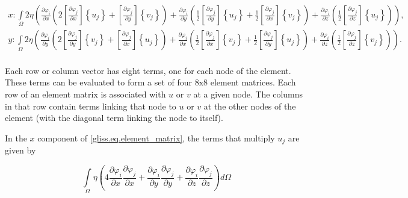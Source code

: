 \begin{equation}
  \label{gliss.eq.element_matrix}
  \begin{split}
    x: \int\limits_{\Omega }{2\eta \left( \frac{\partial {{\varphi }_{i}}}{\partial x}\left( 2\left[ \frac{\partial {{\varphi }_{j}}}{\partial x} \right]\left\{ {{u}_{j}} \right\}+\left[ \frac{\partial {{\varphi }_{j}}}{\partial y} \right]\left\{ {{v}_{j}} \right\} \right)+\frac{\partial {{\varphi }_{i}}}{\partial y}\left( \frac{1}{2}\left[ \frac{\partial {{\varphi }_{j}}}{\partial y} \right]\left\{ {{u}_{j}} \right\}+\frac{1}{2}\left[ \frac{\partial {{\varphi }_{j}}}{\partial x} \right]\left\{ {{v}_{j}} \right\} \right)+\frac{\partial {{\varphi }_{i}}}{\partial z}\left( \frac{1}{2}\left[ \frac{\partial {{\varphi }_{j}}}{\partial z} \right]\left\{ {{u}_{j}} \right\} \right) \right)},  \\
    y: \int\limits_{\Omega }{2\eta \left( \frac{\partial {{\varphi }_{i}}}{\partial y}\left( 2\left[ \frac{\partial {{\varphi }_{j}}}{\partial y} \right]\left\{ {{v}_{j}} \right\}+\left[ \frac{\partial {{\varphi }_{j}}}{\partial x} \right]\left\{ {{u}_{j}} \right\} \right)+\frac{\partial {{\varphi }_{i}}}{\partial x}\left( \frac{1}{2}\left[ \frac{\partial {{\varphi }_{j}}}{\partial x} \right]\left\{ {{v}_{j}} \right\}+\frac{1}{2}\left[ \frac{\partial {{\varphi }_{j}}}{\partial y} \right]\left\{ {{u}_{j}} \right\} \right)+\frac{\partial {{\varphi }_{i}}}{\partial z}\left( \frac{1}{2}\left[ \frac{\partial {{\varphi }_{j}}}{\partial z} \right]\left\{ {{v}_{j}} \right\} \right) \right)}.  \\
  \end{split}
\end{equation}

\noindent
Each row or column vector has eight terms, one for each node of the element.
These terms can be evaluated to form a set of four $8\text{x}8$ element matrices.
Each row of an element matrix is associated with $u$ or $v$ at a given node.  The columns in that row contain terms
linking that node to $u$ or $v$ at the other nodes of the element (with the diagonal term linking the node to itself).  

In the $x$ component of \eqref{gliss.eq.element_matrix}, 
the terms that multiply $u_j$ are given by
 
\begin{equation}
  \label{gliss.eq.matrix_Kuu}
  \int\limits_{\Omega }{\eta \left( 4\frac{\partial {{\varphi }_{i}}}{\partial x}\frac{\partial {{\varphi }_{j}}}{\partial x} +
    \frac{\partial {{\varphi }_{i}}}{\partial y}\frac{\partial {{\varphi}_{j}}}{\partial y} + 
    \frac{\partial {{\varphi }_{i}}}{\partial z}\frac{\partial {{\varphi }_{j}}}{\partial z} \right)}d\Omega
\end{equation}

